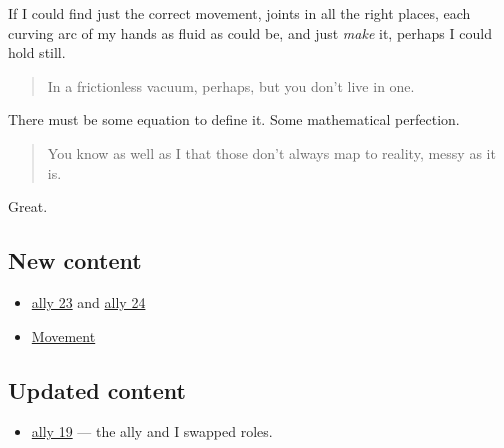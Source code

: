 If I could find just the correct movement, joints in all the right places, each curving arc of my hands as fluid as could be, and just \emph{make} it, perhaps I could hold still.

\begin{quote}
In a frictionless vacuum, perhaps, but you don't live in one.
\end{quote}

There must be some equation to define it. Some mathematical perfection.

\begin{quote}
You know as well as I that those don't always map to reality, messy as it is.
\end{quote}

Great.

\hypertarget{new-content}{%
\subsection{New content}\label{new-content}}

\begin{itemize}
\tightlist
\item
  \href{/23}{ally 23} and \href{/24}{ally 24}
\item
  \href{/movement}{Movement}
\end{itemize}

\hypertarget{updated-content}{%
\subsection{Updated content}\label{updated-content}}

\begin{itemize}
\tightlist
\item
  \href{/19}{ally 19} --- the ally and I swapped roles.
\end{itemize}

